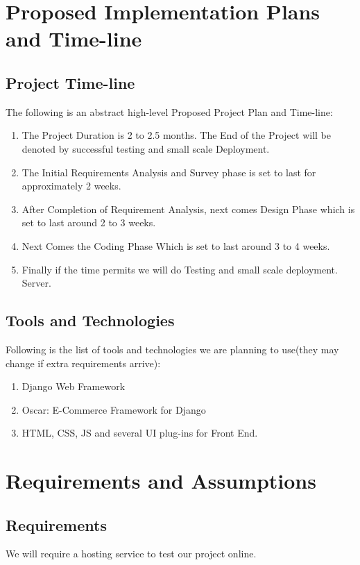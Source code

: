 \documentclass[fleqn,10pt]{../SelfArx} %
\begin{document}
\section{Proposed Implementation Plans and Time-line}

\subsection{Project Time-line}
The following is an abstract high-level Proposed Project Plan and Time-line:
\begin{enumerate}
\item The Project Duration is 2 to 2.5 months. The End of the Project will be denoted by successful testing and small scale Deployment.
\item The Initial Requirements Analysis and Survey phase is set to last for approximately 2 weeks.
\item After Completion of Requirement Analysis, next comes Design Phase which is set to last around 2 to 3 weeks.
\item Next Comes the Coding Phase Which is set to last around 3 to 4 weeks.
\item Finally if the time permits we will do Testing and small scale deployment.
Server.
\end{enumerate}
\subsection{Tools and Technologies}
Following is the list of tools and technologies we are planning to use(they may change if extra requirements arrive):
\begin{enumerate}
\item Django Web Framework
\item Oscar: E-Commerce Framework for Django
\item HTML, CSS, JS and several UI plug-ins for Front End.
\end{enumerate}


\section{Requirements and Assumptions}

\subsection{Requirements}
We will require a hosting service to test our project online.
\end{document}
